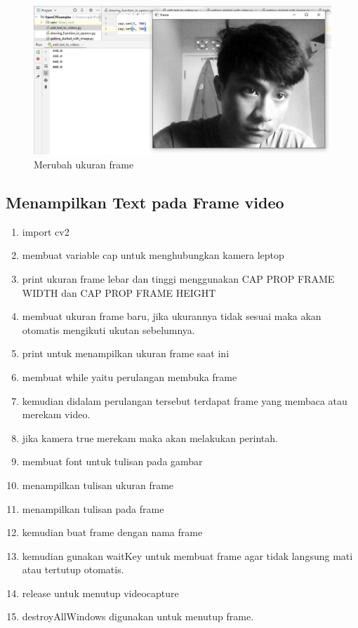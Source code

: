 \begin{figure}[ht]
\centering
\includegraphics[scale=0.4]{figures/2,16.jpg}
\caption{Merubah ukuran frame}
\label{contoh}
\end{figure}



\newpage
\subsection{Menampilkan Text pada Frame video}

\begin{enumerate}
	\item import cv2
	\item membuat variable cap untuk menghubungkan kamera leptop
	\item print ukuran frame lebar dan tinggi menggunakan CAP PROP FRAME WIDTH dan CAP PROP FRAME HEIGHT
	\item membuat ukuran frame baru, jika ukurannya tidak sesuai maka akan otomatis mengikuti ukutan sebelumnya.
	\item print untuk menampilkan ukuran frame saat ini
	\item membuat while yaitu perulangan membuka frame
	\item kemudian didalam perulangan tersebut terdapat frame yang membaca atau merekam video.
	\item jika kamera true merekam maka akan melakukan perintah. 
	\item membuat font untuk tulisan pada gambar
	\item menampilkan tulisan ukuran frame
	\item menampilkan tulisan pada frame
	\item kemudian buat frame dengan nama frame
	\item kemudian gunakan waitKey untuk membuat frame agar tidak langsung mati atau tertutup otomatis.
	\item release untuk menutup videocapture
	\item destroyAllWindows digunakan untuk menutup frame.
\end{enumerate}

